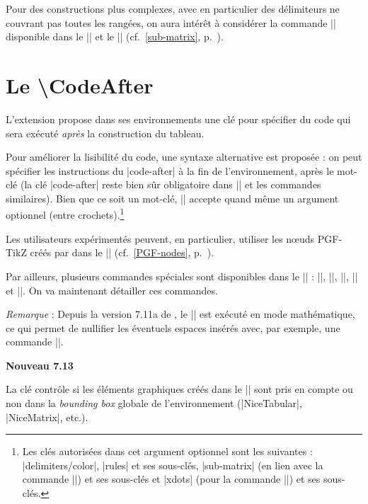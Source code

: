 \documentclass[dvipsnames]{article}
\begin{document}
\bigskip
Pour des constructions plus complexes, avec en particulier des délimiteurs ne
couvrant pas toutes les rangées, on aura intérêt à considérer la commande
|\SubMatrix| disponible dans le |\CodeAfter| et le |\CodeBefore|
(cf.~\ref{sub-matrix}, p.~\pageref{sub-matrix}). 




\section{Le \textbackslash CodeAfter}


\label{code-after}
L'extension  propose dans ses environnements une clé
 pour spécifier du code qui sera exécuté \emph{après} la
construction du tableau.

\medskip
{}
Pour améliorer la lisibilité du code, une syntaxe alternative est proposée : on
peut spécifier les instructions du |code-after| à la fin de l'environnement,
après le mot-clé  (la clé |code-after| reste bien
sûr obligatoire dans |\AutoNiceMatrix| et les commandes similaires). Bien que ce
soit un mot-clé, |\CodeAfter| accepte quand même un argument optionnel (entre
crochets).\footnote{Les clés autorisées dans cet argument optionnel sont les
  suivantes : |delimiters/color|, |rules| et ses sous-clés, |sub-matrix| (en
  lien avec la commande |\SubMatrix|) et ses sous-clés et |xdots| (pour la
  commande |\line|) et ses sous-clés.} 


\medskip
Les utilisateurs expérimentés peuvent, en particulier, utiliser les nœuds
PGF-TikZ créés par  dans le |\CodeAfter|
(cf.~\ref{PGF-nodes}, p.~\pageref{PGF-nodes}).

\medskip
Par ailleurs, plusieurs commandes spéciales sont disponibles dans le
|\CodeAfter| : |\line|, |\SubMatrix|, |\OverBrace|, |\UnderBrace| et
|\TikzEveryCell|. On va maintenant détailler ces commandes.

\medskip
\emph{Remarque} : Depuis la version 7.11a de , le |\CodeAfter|
est exécuté en mode mathématique, ce qui permet de nullifier les éventuels
espaces insérés avec, par exemple, une commande |\SubMatrix|.

\bigskip
\colorbox{yellow!50}{\bfseries Nouveau 7.13}

\smallskip
\nobreak
{}
La clé  contrôle si les éléments graphiques créés dans le
|\CodeAfter| sont pris en compte ou non dans la \emph{bounding box} globale de
l'environnement (|{NiceTabular}|, |{NiceMatrix}|, etc.).
\end{document}
